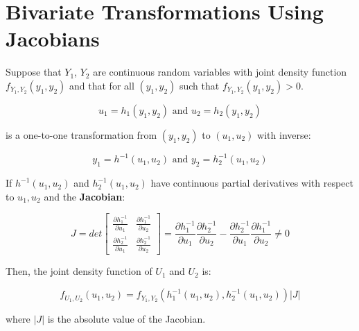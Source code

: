 \documentclass[12pt]{article}
\begin{document}
\section{Bivariate Transformations Using Jacobians}

Suppose that $Y_1$, $Y_2$ are continuous random variables with joint density
function $f_{Y_1,Y_2}(y_1, y_2)$ and that for all $(y_1, y_2)$ such that
$f_{Y_1, Y_2}(y_1, y_2) > 0$.

\[
	u_1 = h_1(y_1, y_2) \text{ and } u_2 = h_2(y_1, y_2)
\]

is a one-to-one transformation from $(y_1, y_2)$ to $(u_1, u_2)$ with inverse:

\[
	y_1 = h^{-1}(u_1, u_2) \text{ and } y_2 = h_2^{-1}(u_1, u_2)
\]

If $h^{-1}(u_1, u_2)$ and $h_2^{-1}(u_1, u_2)$ have continuous partial derivatives with respect to $u_1, u_2$ and the \textbf{Jacobian}:

\[
	J = det \begin{bmatrix}
		\frac{\partial h_{1}^{-1}}{\partial u_1} & \frac{\partial h_{1}^{-1}}{\partial u_2} \\
		\frac{\partial h_{2}^{-1}}{\partial u_1} & \frac{\partial h_{2}^{-1}}{\partial u_2}
	\end{bmatrix} = \frac{\partial h_1^{-1}}{\partial u_1} \frac{\partial h_2^{-1}}{\partial u_2} - \frac{\partial h_2^{-1}}{\partial u_1} \frac{\partial h_1^{-1}}{\partial u_2} \neq 0
\]

Then, the joint density function of $U_1$ and $U_2$ is:

\[
	f_{U_1, U_2}(u_1, u_2) = f_{Y_1, Y_2}(h_1^{-1}(u_1, u_2), h_2^{-1}(u_1, u_2)) \left|J\right|
\]

where $\left|J\right|$ is the absolute value of the Jacobian.
\end{document}
